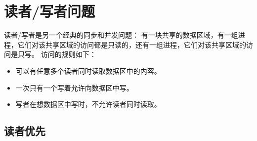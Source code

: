 
\section{读者/写者问题}
{
    读者/写者是另一个经典的同步和并发问题：
    有一块共享的数据区域，有一组进程，它们对该共享区域的访问都是只读的，还有一组进程，它们对该共享区域的访问是只写。
    访问的规则如下：

    \begin{itemize}
        \item 可以有任意多个读者同时读取数据区中的内容。
        \item 一次只有一个写着允许向数据区中写。
        \item 写者在想数据区中写时，不允许读者同时读取。
    \end{itemize}

    \subsection{读者优先}
    {

    }
}
